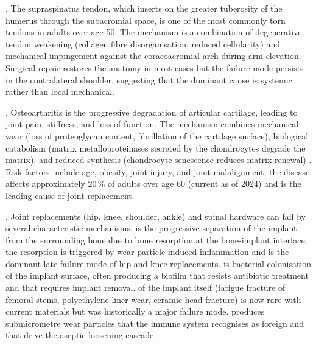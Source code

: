 . The supraspinatus tendon,
which inserts on the greater tuberosity of the humerus through the
subacromial space, is one of the most commonly torn tendons in
adults over age 50. The mechanism is a combination of degenerative
tendon weakening (collagen fibre disorganisation, reduced
cellularity) and mechanical impingement against the coracoacromial
arch during arm elevation. Surgical repair restores the anatomy in
most cases but the failure mode persists in the contralateral
shoulder, suggesting that the dominant cause is systemic rather
than local mechanical.

. Osteoarthritis is the
progressive degradation of articular cartilage, leading to joint
pain, stiffness, and loss of function. The mechanism combines
mechanical wear (loss of proteoglycan content, fibrillation of the
cartilage surface), biological catabolism (matrix metalloproteinases
secreted by the chondrocytes degrade the matrix), and reduced
synthesis (chondrocyte senescence reduces matrix renewal)
\cite[p.~1241]{paper:v6c06-pelletier-2001}. Risk factors include age,
obesity, joint injury, and joint malalignment; the disease affects
approximately $20\,\%$ of adults over age 60 (current as of 2024) and
is the leading cause of joint replacement.

. Joint replacements (hip, knee,
shoulder, ankle) and spinal hardware can fail by several
characteristic mechanisms.  is the
progressive separation of the implant from the surrounding bone due
to bone resorption at the bone-implant interface; the resorption is
triggered by wear-particle-induced inflammation and is the dominant
late failure mode of hip and knee replacements.  is bacterial colonisation of the implant surface, often
producing a biofilm that resists antibiotic treatment and that
requires implant removal.  of the
implant itself (fatigue fracture of femoral stems, polyethylene
liner wear, ceramic head fracture) is now rare with current
materials but was historically a major failure mode.  produces submicrometre wear particles that the immune
system recognises as foreign and that drive the aseptic-loosening
cascade.

